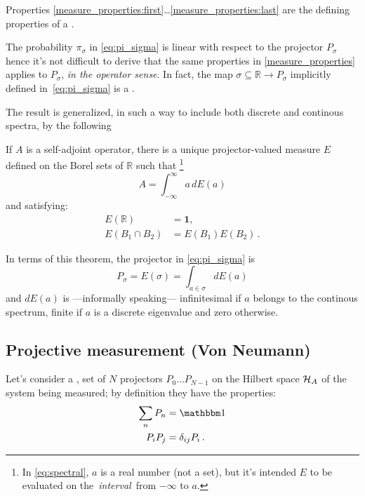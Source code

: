 \begin{remark}
  Properties \ref{measure_properties:first}\dots\ref{measure_properties:last}
  are the defining properties of a  \parencite{EncMath_Measure}.
\end{remark}

The probability $\pi_{\sigma}$ in \eqref{eq:pi_sigma} is linear with respect to the projector
$P_{\sigma}$ hence it's not difficult to derive that the same properties in
\autoref{measure_properties} applies to $P_{\sigma}$, \emph{in the operator sense}.
In fact, the map $\sigma \subseteq \mathbb{R} \rightarrow P_{\sigma}$
implicitly defined in~\eqref{eq:pi_sigma} is a .

The result is generalized,
in such a way to include both discrete and continous spectra,
by the following \parencite{VonNeumann, Ballentine}
\begin{theorem}
  If $A$ is a self-adjoint operator,
  there is a unique projector-valued measure $E$
  defined on the Borel sets of $\mathbb{R}$
  such that
  \footnote{
    In \eqref{eq:spectral}, $a$ is a real number (not a set),
    but it's intended $E$ to be evaluated
    on the~\emph{interval}~from $-\infty$ to $a$.
  }
  \begin{equation}\label{eq:spectral}
    A=\int_{-\infty}^{\infty}a\, dE(a)
  \end{equation}
  and satisfying:
  \begin{align*}
    E(\mathbb{R})       & =\mathbf{1},\\
    E(B_{1}\cap B_{2}) & =E(B_{1})E(B_{2})\,.
  \end{align*}
\end{theorem}

In terms of this theorem, the projector in \eqref{eq:pi_sigma} is
\begin{equation}\label{eq:P_sigma_spectral}
  P_{\sigma} = E(\sigma) = \int_{a\in\sigma}dE(a)
\end{equation}
and $dE(a)$ is
---informally speaking---
infinitesimal if $a$ belongs to the continous spectrum,
finite if $a$ is a discrete eigenvalue
and zero otherwise.


\subsection{Projective measurement (Von Neumann)}

Let's consider a ,  set of $N$ projectors
$P_0 \dots P_{N-1}$ on the Hilbert space $\mathcal{H}_A$
of the system being measured;
by definition they have the properties:
\begin{align}
  \sum_n P_n  &= \idop \\
  P_i P_j     &= \delta_{ij}P_i \, \text{.}
\end{align}

